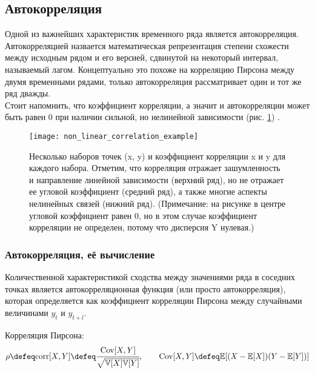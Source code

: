 \subsection{Автокорреляция}

Одной из важнейших характеристик временного ряда является автокорреляция. Автокорреляцией 
назвается математическая репрезентация степени \guillemotleft схожести\guillemotright {} между 
исходным рядом и его версией, сдвинутой на некоторый интервал, называемый лагом. Концептуально 
это похоже на корреляцию Пирсона между двумя временными рядами, только автокорреляция рассматривает 
один и тот же ряд дважды. \\

Стоит напомнить, что коэффициент корреляции, а значит и автокорреляции может быть равен 0 при наличии сильной, 
но нелинейной зависимости (рис. \ref{fig:non_linear_correlation_example}) \cite{pml1Book}.\\

\begin{figure}[h!]
    \centering
    \texttt{[image: non\_linear\_correlation\_example]}
    \caption{Несколько наборов точек (x, y) и коэффициент корреляции x и y
    для каждого набора. Отметим, что корреляция отражает зашумленность и направление 
    линейной зависимости (верхний ряд), но не отражает ее угловой
    коэффициент (средний ряд), а также многие аспекты нелинейных связей (нижний ряд). 
    (Примечание: на рисунке в центре угловой коэффициент равен 0, но
    в этом случае коэффициент корреляции не определен, потому что дисперсия Y
    нулевая.)}
    \label{fig:non_linear_correlation_example}
\end{figure}

\subsubsection{Автокорреляция, её вычисление}

Количественной характеристикой сходства между значениями ряда в соседних точках является 
автокорреляционная функция (или просто автокорреляция), которая определяется как коэффициент 
корреляции Пирсона между случайными величинами \(y_t\) и \(y_{t+l}\).

Корреляция Пирсона:
\begin{equation*}
    \rho \defeq \text{corr}[X, Y] \defeq 
    \cfrac{\text{Cov}[X, Y]}{\sqrt{\mathbb{V}[X]\mathbb{V}[Y]}}, \qquad 
    \text{Cov}[X, Y] \defeq \mathbb{E}[(X - \mathbb{E}[X])(Y - \mathbb{E}[Y])]
\end{equation*}

